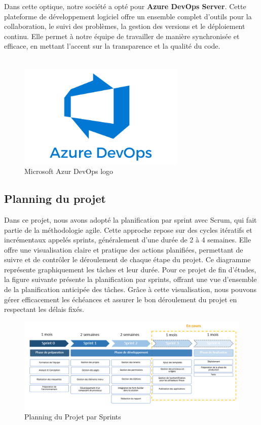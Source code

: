 Dans cette optique, notre société a opté pour \textbf{Azure DevOps Server}. Cette plateforme de développement logiciel offre un ensemble complet d'outils pour la collaboration, le suivi des problèmes, la gestion des versions et le déploiement continu. Elle permet à notre équipe de travailler de manière synchronisée et efficace, en mettant l'accent sur la transparence et la qualité du code.
\\
\\
\begin{figure}[H]
    \centering
    \includegraphics[width=8cm]{Figures/azur.png}
    \caption{Microsoft Azur DevOps logo}
\end{figure}


\subsection{Planning du projet}

\hspace{\parindent}Dans ce projet, nous avons adopté la planification par sprint avec Scrum, qui fait partie de la méthodologie agile. Cette approche repose sur des cycles itératifs et incrémentaux appelés sprints, généralement d'une durée de 2 à 4 semaines. Elle offre une visualisation claire et pratique des actions planifiées, permettant de suivre et de contrôler le déroulement de chaque étape du projet. Ce diagramme représente graphiquement les tâches et leur durée. Pour ce projet de fin d’études, la figure suivante présente la planification par sprints, offrant une vue d'ensemble de la planification anticipée des tâches. Grâce à cette visualisation, nous pouvons gérer efficacement les échéances et assurer le bon déroulement du projet en respectant les délais fixés.

\begin{figure}[H]
    \centering
    \includegraphics[width=18cm]{Figures/sprints.PNG}
    \caption{Planning du Projet par Sprints}
\end{figure}



